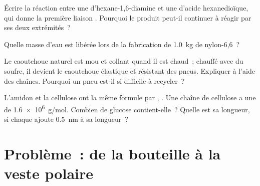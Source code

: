 \begin{exercise}[$\star\star\star$]\label{exo:g12:polymers:12}
Écrire la réaction entre une  d'hexane-1,6-diamine et une
 d'acide hexanedioïque, qui donne la première liaison .
Pourquoi le produit peut-il continuer à réagir par ses deux
extrémités~?
\end{exercise}

\begin{exercise}[$\star\star\star$]\label{exo:g12:polymers:13}
Quelle masse d'eau est libérée lors de la fabrication de \qty{1.0}{kg}
de nylon-6,6~?
\end{exercise}

\begin{exercise}[$\star\star\star$]\label{exo:g12:polymers:14}
Le caoutchouc naturel est mou et collant quand il est chaud~; chauffé
avec du soufre, il devient le caoutchouc élastique et résistant des
pneus. Expliquer à l'aide des chaînes. Pourquoi un pneu est-il si
difficile à recycler~?
\end{exercise}

\begin{exercise}[$\star\star\star$]\label{exo:g12:polymers:15}
L'amidon et la cellulose ont la même formule par , .
Une chaîne de cellulose a une  de \qty{1.6e6}{g/mol}.
Combien de  glucose contient-elle~? Quelle est sa longueur, si
chaque  ajoute \qty{0.5}{nm} à sa longueur~?
\end{exercise}

\section{Problème~: de la bouteille à la veste polaire}

